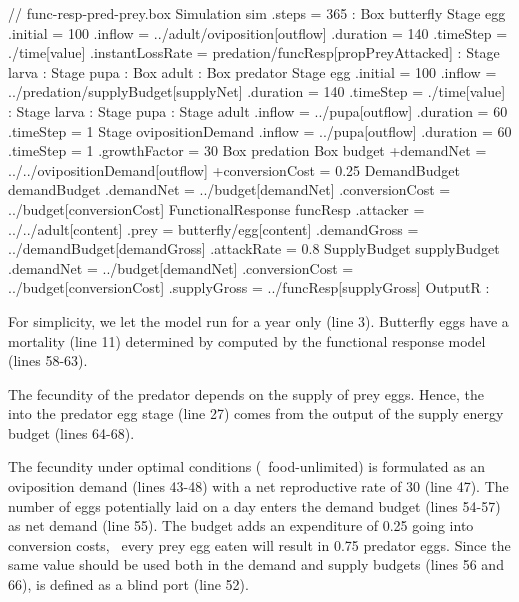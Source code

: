 \lstset{numbers=left}
\begin{boxscript}
// func-resp-pred-prey.box
Simulation sim {
  .steps = 365
  :
  Box butterfly {
    Stage egg {
      .initial = 100 
      .inflow = ../adult/oviposition[outflow] 
      .duration = 140
      .timeStep = ./time[value]
      .instantLossRate = predation/funcResp[propPreyAttacked]
      :
    }
    Stage larva {
    :
    }
    Stage pupa {
    :
    }
    Box adult {
    :
    }
  }
  Box predator {
    Stage egg {
      .initial = 100 
      .inflow = ../predation/supplyBudget[supplyNet]
      .duration = 140
      .timeStep = ./time[value]
      :
    }
    Stage larva {
    :
    }
    Stage pupa {
    :
    }
    Stage adult {
      .inflow = ../pupa[outflow]
      .duration = 60
      .timeStep = 1
    }
    Stage ovipositionDemand {
      .inflow = ../pupa[outflow]
      .duration = 60
      .timeStep = 1
      .growthFactor = 30
    }
    Box predation {
      Box budget {
        +demandNet = ../../ovipositionDemand[outflow]
        +conversionCost = 0.25
      }
      DemandBudget demandBudget {
        .demandNet = ../budget[demandNet]
        .conversionCost = ../budget[conversionCost]
      }
      FunctionalResponse funcResp {
        .attacker = ../../adult[content]
        .prey = butterfly/egg[content]
        .demandGross = ../demandBudget[demandGross]
        .attackRate = 0.8
      }
      SupplyBudget supplyBudget {
        .demandNet = ../budget[demandNet]
        .conversionCost = ../budget[conversionCost]
        .supplyGross = ../funcResp[supplyGross]
      }
    }
  }
  OutputR {
  :
  }
}
\end{boxscript}
\lstset{numbers=none}

For simplicity, we let the model run for a year only (line 3). Butterfly eggs have a  mortality (line 11) determined by  computed by the functional response model (lines 58-63). 

The fecundity of the predator depends on the supply of prey eggs. Hence, the  into the predator egg stage (line 27) comes from the  output of the supply energy budget (lines 64-68).

The fecundity under optimal conditions (\ie\ food-unlimited) is formulated as an oviposition demand (lines 43-48) with a net reproductive rate of 30 (line 47). The number of eggs potentially laid on a day enters the demand budget (lines 54-57) as net demand (line 55). The budget adds an expenditure of 0.25 going into conversion costs, \ie\ every prey egg eaten will result in 0.75 predator eggs. Since the same value should be used both in the demand and supply budgets (lines 56 and 66),  is defined as a blind port (line 52).

